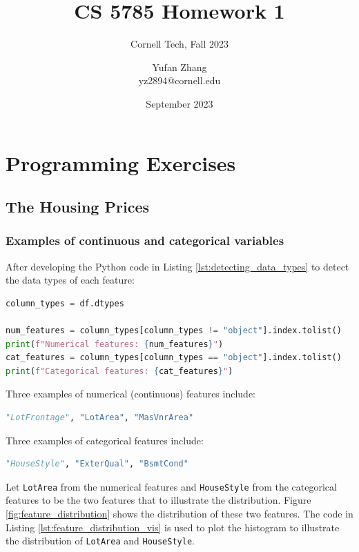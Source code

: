 \documentclass[10pt]{article}
\title{CS 5785 Homework 1}
\subtitle{Cornell Tech, Fall 2023}
\author{
    Yufan Zhang\\
    yz2894@cornell.edu
}
\date{September 2023}
\begin{document}
\maketitle

\section{Programming Exercises}

\subsection{The Housing Prices}

\subsubsection{Examples of continuous and categorical variables}

After developing the Python code in Listing \ref{lst:detecting_data_types} to detect the data types of each feature:

\begin{lstlisting}[language=Python, label={lst:detecting_data_types}, caption={Detecting the data types of each feature}]
column_types = df.dtypes

num_features = column_types[column_types != "object"].index.tolist()
print(f"Numerical features: {num_features}")
cat_features = column_types[column_types == "object"].index.tolist()
print(f"Categorical features: {cat_features}")
\end{lstlisting}

Three examples of numerical (continuous) features include:

\begin{lstlisting}[language=Python]
    "LotFrontage", "LotArea", "MasVnrArea"
\end{lstlisting}

Three examples of categorical features include:

\begin{lstlisting}[language=Python]
    "HouseStyle", "ExterQual", "BsmtCond"
\end{lstlisting}

Let \texttt{LotArea} from the numerical features and \texttt{HouseStyle} from the categorical features to be the two features that to illustrate the distribution. Figure \ref{fig:feature_distribution} shows the distribution of these two features. The code in Listing \ref{lst:feature_distribution_vis} is used to plot the histogram to illustrate the distribution of \texttt{LotArea} and \texttt{HouseStyle}.
\end{document}
